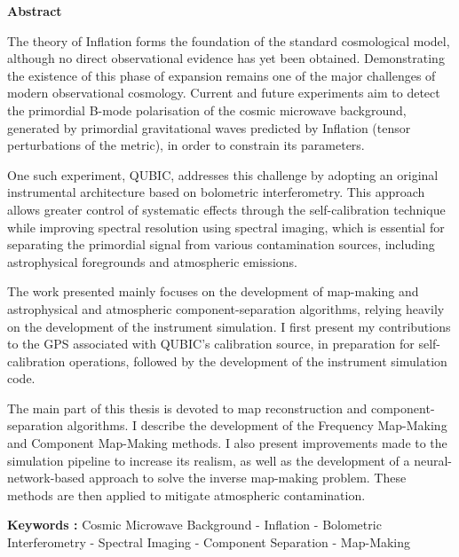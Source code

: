 \newpage

\hspace{5cm} \textbf{\Huge Abstract}

\vspace{1cm}

The theory of Inflation forms the foundation of the standard cosmological model, although no direct observational evidence has yet been obtained. Demonstrating the existence of this phase of expansion remains one of the major challenges of modern observational cosmology. Current and future experiments aim to detect the primordial B-mode polarisation of the cosmic microwave background, generated by primordial gravitational waves predicted by Inflation (tensor perturbations of the metric), in order to constrain its parameters.

One such experiment, QUBIC, addresses this challenge by adopting an original instrumental architecture based on bolometric interferometry. This approach allows greater control of systematic effects through the self-calibration technique while improving spectral resolution using spectral imaging, which is essential for separating the primordial signal from various contamination sources, including astrophysical foregrounds and atmospheric emissions.

The work presented mainly focuses on the development of map-making and astrophysical and atmospheric component-separation algorithms, relying heavily on the development of the instrument simulation. I first present my contributions to the GPS associated with QUBIC’s calibration source, in preparation for self-calibration operations, followed by the development of the instrument simulation code.

The main part of this thesis is devoted to map reconstruction and component-separation algorithms. I describe the development of the Frequency Map-Making and Component Map-Making methods. I also present improvements made to the simulation pipeline to increase its realism, as well as the development of a neural-network-based approach to solve the inverse map-making problem. These methods are then applied to mitigate atmospheric contamination.

\vspace{0.5cm}

\textbf{Keywords :} Cosmic Microwave Background - Inflation - Bolometric Interferometry - Spectral Imaging - Component Separation - Map-Making

